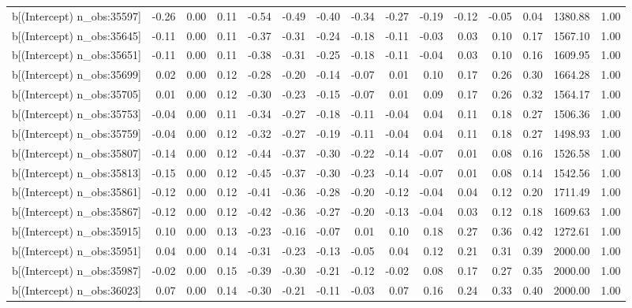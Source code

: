 \begin{table}[ht]
\begin{tabular}{rrrrrrrrrrrrrrr}
  b[(Intercept) n\_obs:35597] & -0.26 & 0.00 & 0.11 & -0.54 & -0.49 & -0.40 & -0.34 & -0.27 & -0.19 & -0.12 & -0.05 & 0.04 & 1380.88 & 1.00 \\ 
  b[(Intercept) n\_obs:35645] & -0.11 & 0.00 & 0.11 & -0.37 & -0.31 & -0.24 & -0.18 & -0.11 & -0.03 & 0.03 & 0.10 & 0.17 & 1567.10 & 1.00 \\ 
  b[(Intercept) n\_obs:35651] & -0.11 & 0.00 & 0.11 & -0.38 & -0.31 & -0.25 & -0.18 & -0.11 & -0.04 & 0.03 & 0.10 & 0.16 & 1609.95 & 1.00 \\ 
  b[(Intercept) n\_obs:35699] & 0.02 & 0.00 & 0.12 & -0.28 & -0.20 & -0.14 & -0.07 & 0.01 & 0.10 & 0.17 & 0.26 & 0.30 & 1664.28 & 1.00 \\ 
  b[(Intercept) n\_obs:35705] & 0.01 & 0.00 & 0.12 & -0.30 & -0.23 & -0.15 & -0.07 & 0.01 & 0.09 & 0.17 & 0.26 & 0.32 & 1564.17 & 1.00 \\ 
  b[(Intercept) n\_obs:35753] & -0.04 & 0.00 & 0.11 & -0.34 & -0.27 & -0.18 & -0.11 & -0.04 & 0.04 & 0.11 & 0.18 & 0.27 & 1506.36 & 1.00 \\ 
  b[(Intercept) n\_obs:35759] & -0.04 & 0.00 & 0.12 & -0.32 & -0.27 & -0.19 & -0.11 & -0.04 & 0.04 & 0.11 & 0.18 & 0.27 & 1498.93 & 1.00 \\ 
  b[(Intercept) n\_obs:35807] & -0.14 & 0.00 & 0.12 & -0.44 & -0.37 & -0.30 & -0.22 & -0.14 & -0.07 & 0.01 & 0.08 & 0.16 & 1526.58 & 1.00 \\ 
  b[(Intercept) n\_obs:35813] & -0.15 & 0.00 & 0.12 & -0.45 & -0.37 & -0.30 & -0.23 & -0.14 & -0.07 & 0.01 & 0.08 & 0.14 & 1542.56 & 1.00 \\ 
  b[(Intercept) n\_obs:35861] & -0.12 & 0.00 & 0.12 & -0.41 & -0.36 & -0.28 & -0.20 & -0.12 & -0.04 & 0.04 & 0.12 & 0.20 & 1711.49 & 1.00 \\ 
  b[(Intercept) n\_obs:35867] & -0.12 & 0.00 & 0.12 & -0.42 & -0.36 & -0.27 & -0.20 & -0.13 & -0.04 & 0.03 & 0.12 & 0.18 & 1609.63 & 1.00 \\ 
  b[(Intercept) n\_obs:35915] & 0.10 & 0.00 & 0.13 & -0.23 & -0.16 & -0.07 & 0.01 & 0.10 & 0.18 & 0.27 & 0.36 & 0.42 & 1272.61 & 1.00 \\ 
  b[(Intercept) n\_obs:35951] & 0.04 & 0.00 & 0.14 & -0.31 & -0.23 & -0.13 & -0.05 & 0.04 & 0.12 & 0.21 & 0.31 & 0.39 & 2000.00 & 1.00 \\ 
  b[(Intercept) n\_obs:35987] & -0.02 & 0.00 & 0.15 & -0.39 & -0.30 & -0.21 & -0.12 & -0.02 & 0.08 & 0.17 & 0.27 & 0.35 & 2000.00 & 1.00 \\ 
  b[(Intercept) n\_obs:36023] & 0.07 & 0.00 & 0.14 & -0.30 & -0.21 & -0.11 & -0.03 & 0.07 & 0.16 & 0.24 & 0.33 & 0.40 & 2000.00 & 1.00 \\ 

\end{tabular}
\end{table}
